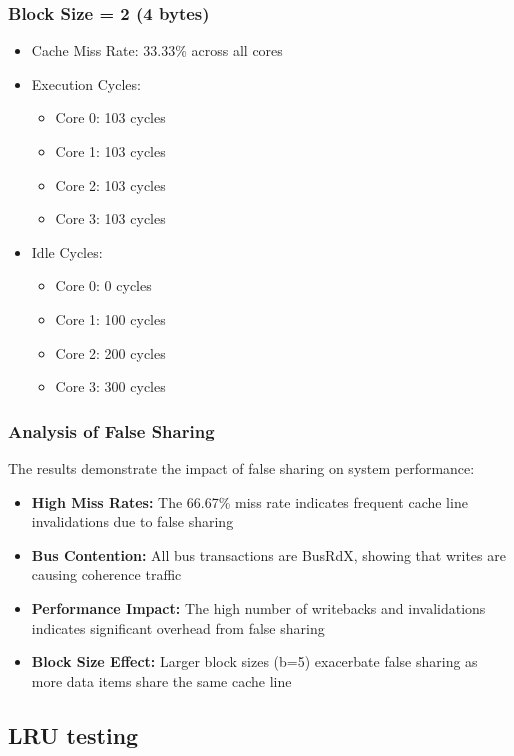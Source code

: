 \documentclass[10pt]{article}
\begin{document}
\subsubsection{Block Size = 2 (4 bytes)}
\begin{itemize}
    \item Cache Miss Rate: 33.33\% across all cores
    \item Execution Cycles:
    \begin{itemize}
        \item Core 0: 103 cycles
        \item Core 1: 103 cycles
        \item Core 2: 103 cycles
        \item Core 3: 103 cycles
    \end{itemize}
    \item Idle Cycles:
    \begin{itemize}
        \item Core 0: 0 cycles
        \item Core 1: 100 cycles
        \item Core 2: 200 cycles
        \item Core 3: 300 cycles
    \end{itemize}
\end{itemize}

\subsubsection{Analysis of False Sharing}
The results demonstrate the impact of false sharing on system performance:
\begin{itemize}
    \item \textbf{High Miss Rates:} The 66.67\% miss rate indicates frequent cache line invalidations due to false sharing
    \item \textbf{Bus Contention:} All bus transactions are BusRdX, showing that writes are causing coherence traffic
    \item \textbf{Performance Impact:} The high number of writebacks and invalidations indicates significant overhead from false sharing
    \item \textbf{Block Size Effect:} Larger block sizes (b=5) exacerbate false sharing as more data items share the same cache line
\end{itemize}

\subsection{LRU testing}
\end{document}
